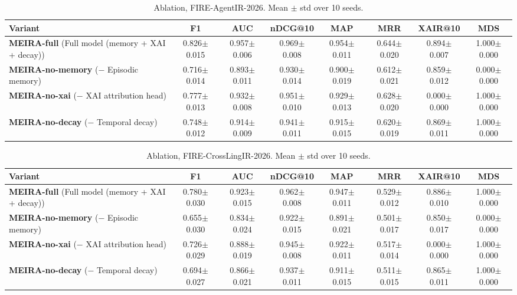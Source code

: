 \begin{table}[tb]
\setlength{\tabcolsep}{3pt}
\footnotesize
\caption{Ablation, FIRE-AgentIR-2026. Mean $\pm$ std over 10 seeds.}
\label{tab:abl-agent}
\centering
\begin{tabular}{lccccccc}
\toprule
Variant & F1 & AUC & nDCG@10 & MAP & MRR & XAIR@10 & MDS \\
\midrule
\textbf{MEIRA-full} (Full model (memory + XAI + decay)) & 0.826$\pm$0.015 & 0.957$\pm$0.006 & 0.969$\pm$0.008 & 0.954$\pm$0.011 & 0.644$\pm$0.020 & 0.894$\pm$0.007 & 1.000$\pm$0.000 \\
\textbf{MEIRA-no-memory} ($- $ Episodic memory) & 0.716$\pm$0.014 & 0.893$\pm$0.011 & 0.930$\pm$0.014 & 0.900$\pm$0.019 & 0.612$\pm$0.021 & 0.859$\pm$0.012 & 0.000$\pm$0.000 \\
\textbf{MEIRA-no-xai} ($- $ XAI attribution head) & 0.777$\pm$0.013 & 0.932$\pm$0.008 & 0.951$\pm$0.010 & 0.929$\pm$0.013 & 0.628$\pm$0.020 & 0.000$\pm$0.000 & 1.000$\pm$0.000 \\
\textbf{MEIRA-no-decay} ($- $ Temporal decay) & 0.748$\pm$0.012 & 0.914$\pm$0.009 & 0.941$\pm$0.011 & 0.915$\pm$0.015 & 0.620$\pm$0.019 & 0.869$\pm$0.011 & 1.000$\pm$0.000 \\
\bottomrule
\end{tabular}
\end{table}

\begin{table}[tb]
\setlength{\tabcolsep}{3pt}
\footnotesize
\caption{Ablation, FIRE-CrossLingIR-2026. Mean $\pm$ std over 10 seeds.}
\label{tab:abl-cross}
\centering
\begin{tabular}{lccccccc}
\toprule
Variant & F1 & AUC & nDCG@10 & MAP & MRR & XAIR@10 & MDS \\
\midrule
\textbf{MEIRA-full} (Full model (memory + XAI + decay)) & 0.780$\pm$0.030 & 0.923$\pm$0.015 & 0.962$\pm$0.008 & 0.947$\pm$0.011 & 0.529$\pm$0.012 & 0.886$\pm$0.010 & 1.000$\pm$0.000 \\
\textbf{MEIRA-no-memory} ($- $ Episodic memory) & 0.655$\pm$0.030 & 0.834$\pm$0.024 & 0.922$\pm$0.015 & 0.891$\pm$0.021 & 0.501$\pm$0.017 & 0.850$\pm$0.017 & 0.000$\pm$0.000 \\
\textbf{MEIRA-no-xai} ($- $ XAI attribution head) & 0.726$\pm$0.029 & 0.888$\pm$0.019 & 0.945$\pm$0.008 & 0.922$\pm$0.011 & 0.517$\pm$0.014 & 0.000$\pm$0.000 & 1.000$\pm$0.000 \\
\textbf{MEIRA-no-decay} ($- $ Temporal decay) & 0.694$\pm$0.027 & 0.866$\pm$0.021 & 0.937$\pm$0.011 & 0.911$\pm$0.015 & 0.511$\pm$0.015 & 0.865$\pm$0.011 & 1.000$\pm$0.000 \\
\bottomrule
\end{tabular}
\end{table}

